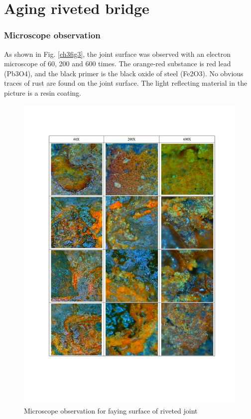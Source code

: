 \chapter{Aging riveted bridge}
\label{app2}
\onehalfspacing


\subsection{Microscope observation}\label{app-obsur}

As shown in Fig. \ref{ch3fig3}, the joint surface was observed with an electron microscope of 60, 200 and 600 times. The orange-red substance is red lead (Pb3O4), and the black primer is the black oxide of steel (Fe2O3). No obvious traces of rust are found on the joint surface. The light reflecting material in the picture is a resin coating.

\begin{figure}
    \centering
    \includegraphics[width=1\linewidth]{imgs//app2/fig-ob-surface.pdf}
    \caption{Microscope observation for faying surface of riveted joint}
    \label{fig-obsur}
\end{figure}


